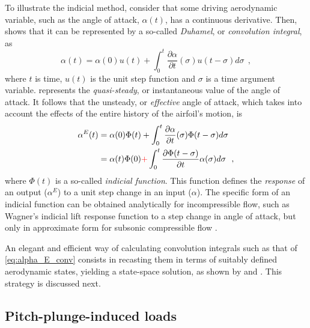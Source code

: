 \documentclass[12pt,a4paper,oneside,english]{abntex2} %
\newcommand{\fix}[1]{{\color{red}#1}}
\newcommand{\del}[2]{\frac{\partial#1}{\partial#2}}
\begin{document}
To illustrate the indicial method, consider that some driving aerodynamic variable, such as the angle of attack, $\alpha(t)$, has a continuous derivative. Then,  shows that it can be represented by a so-called \textit{Duhamel}, or \textit{convolution integral}, as
\begin{equation}
    \alpha(t) = \alpha(0) u(t) + \int_0^t\del{\alpha}{t}(\sigma) u(t-\sigma) d\sigma \ \ ,
    \label{eq:alpha_qs_conv}
\end{equation}
where $t$ is time, $u(t)$ is the unit step function and $\sigma$ is a time argument variable.  represents the \textit{quasi-steady}, or instantaneous value of the angle of attack. It follows that the unsteady, or \textit{effective} angle of attack, which takes into account the effects of the entire history of the airfoil's motion, is
\begin{equation}
\begin{aligned}
    \alpha^E(t) &= \alpha(0)\Phi(t) + \int_0^t \del{\alpha}{t}(\sigma) \Phi(t-\sigma) d\sigma
    \\
    &= \alpha(t)\Phi(0) \fix{+} \int_0^t \del{\Phi(t-\sigma)}{t} \alpha(\sigma) d\sigma \ \ ,
    \label{eq:alpha_E_conv}
\end{aligned}
\end{equation}
where $\Phi(t)$ is a so-called \textit{indicial function}. This function defines the \textit{\fix{response}} of an output ($\alpha^E$) to a \fix{unit} step change in an input ($\alpha$). The specific form of an indicial function can be obtained analytically for incompressible flow, such as Wagner's indicial lift response function to a step change in angle of attack, but only in approximate form for subsonic compressible flow \cite{leishman2006principles}.

An elegant and efficient way of calculating convolution integrals such as that of \cref{eq:alpha_E_conv} consists \fix{in} recasting them in terms of suitably defined aerodynamic states, yielding a state-space solution, as shown by  and . This strategy is discussed next.

\subsection{Pitch-plunge-induced loads}
\label{subsec:pp_attached_loads}
\end{document}
